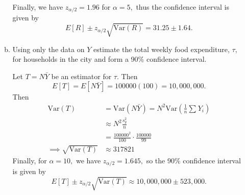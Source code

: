 \documentclass{article}
\newcommand{\var}{\mathrm{Var}}
\begin{document}
\begin{itemize}
\begin{enumerate}[a.]
\begin{soln}
					Finally, we have $z_{\alpha/2}=1.96$ for $\alpha=5,$ thus the confidence interval is given by \[E[R]\pm z_{\alpha/2}\sqrt{\var(R)} = \boxed{31.25\pm1.64}.\]
					
				\end{soln}

			\item Using only the data on $Y$ estimate the total weekly food expenditure, $\tau,$ for households in the city and form a 90\% confidence interval.
				\begin{soln}
					Let $T=N\bar{Y}$ be an estimator for $\tau.$ Then \[E[T]=E[N\bar{Y}]=100000(100) = 10, 000, 000.\] Then 
					\begin{align*}
						\var(T) &=\var(N\bar{Y}) = N^2\var\left( \frac{1}{n}\sum_{}^{} Y_i \right) \\
						&\approx N^2 \frac{s_y^2}{n} \\
						&= \frac{100000^2}{100}\cdot \frac{100000}{99} \\
						\implies \sqrt{\var(T)} &\approx 317821
					\end{align*}
					Finally, for $\alpha=10,$ we have $z_{\alpha/2}=1.645,$ so the 90\% confidence interval is given by \[E[T]\pm z_{\alpha/2}\sqrt{\var(T)} \approx \boxed{10, 000, 000 \pm 523, 000}. \]
				\end{soln}
				
		\end{enumerate}

\end{itemize}
\end{document}
